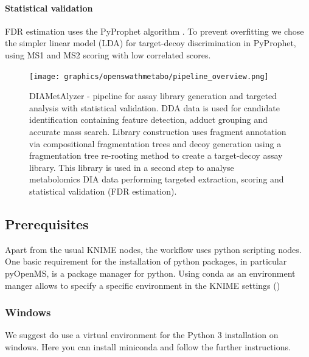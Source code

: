\paragraph{Statistical validation} FDR estimation uses the PyProphet algorithm \cite{Teleman2015}. To prevent overfitting we chose the simpler linear model (LDA) for target-decoy discrimination in PyProphet, using MS1 and MS2 scoring with low correlated scores.

\begin{figure}[!t]
  \centering
  \texttt{[image: graphics/openswathmetabo/pipeline\_overview.png]}
  \caption{DIAMetAlyzer - pipeline for assay library generation and targeted analysis with statistical validation. DDA data is used for candidate identification containing feature detection, adduct grouping and accurate mass search. Library construction uses fragment annotation via compositional fragmentation trees and decoy generation using a fragmentation tree re-rooting method to create a target-decoy assay library. This library is used in a second step to analyse metabolomics DIA data performing targeted extraction, scoring and statistical validation (FDR estimation).}
  \label{fig:pipline_overview}
\end{figure}

\subsection{Prerequisites}
Apart from the usual KNIME nodes, the workflow uses python scripting nodes. One basic requirement for the installation of python packages, in particular pyOpenMS, is a package manager for python. Using conda as an environment manger allows to specify a specific environment in the KNIME settings ()

\subsubsection{Windows}
We suggest do use a virtual environment for the Python 3 installation on windows. 
Here you can install miniconda and follow the further instructions. \\

